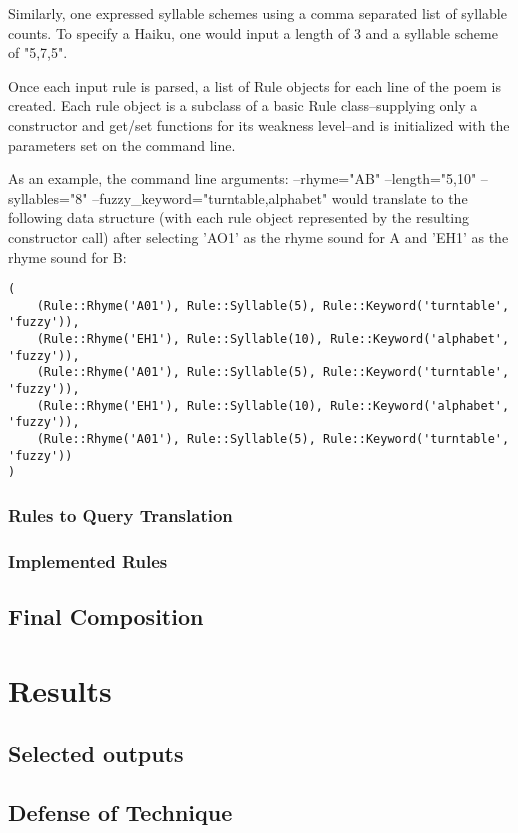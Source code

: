 \documentclass[10pt]{article}
\begin{document}
Similarly, one expressed syllable schemes using a comma separated list of
syllable counts. To specify a Haiku, one would input a length of 3 and a
syllable scheme of "5,7,5".

Once each input rule is parsed, a list of Rule objects for each line of the
poem is created. Each rule object is a subclass of a basic Rule
class--supplying only a constructor and get/set functions for its weakness
level--and is initialized with the parameters set on the command line.

As an example, the command line arguments:
--rhyme="AB" --length="5,10" --syllables="8" --fuzzy\_keyword="turntable,alphabet"
would translate to the following data structure (with each rule object
represented by the resulting constructor call) after selecting 'AO1' as the
rhyme sound for A and 'EH1' as the rhyme sound for B:

\begin{verbatim}
(
    (Rule::Rhyme('A01'), Rule::Syllable(5), Rule::Keyword('turntable', 'fuzzy')),
    (Rule::Rhyme('EH1'), Rule::Syllable(10), Rule::Keyword('alphabet', 'fuzzy')),
    (Rule::Rhyme('A01'), Rule::Syllable(5), Rule::Keyword('turntable', 'fuzzy')),
    (Rule::Rhyme('EH1'), Rule::Syllable(10), Rule::Keyword('alphabet', 'fuzzy')),
    (Rule::Rhyme('A01'), Rule::Syllable(5), Rule::Keyword('turntable', 'fuzzy'))
)
\end{verbatim}

\subsubsection{Rules to Query Translation}
\subsubsection{Implemented Rules}
\subsection{Final Composition}
\section{Results}
\subsection{Selected outputs}
\subsection{Defense of Technique}
\end{document}
